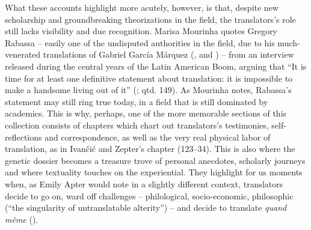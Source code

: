 \documentclass{article}
\begin{document}
What these accounts highlight more acutely, however, is that, despite
new scholarship and groundbreaking theorizations in the field, the
translators's role still lacks visibility and due recognition. Marisa
Mourinha quotes Gregory Rabassa -- easily one of the undisputed
authorities in the field, due to his much-venerated translations of
Gabriel García Márquez (\citeyear{marquez_one_1970}, \citeyear{marquez_autumn_1975} and \citeyear{marquez_chronicle_1983}) -- from an interview
released during the central years of the Latin American Boom, arguing
that ``It is time for at least one definitive statement about
translation: it is impossible to make a handsome living out of it''
(; qtd. 149). As Mourinha notes, Rabassa's statement may
still ring true today, in a field that is still dominated by academics.
This is why, perhaps, one of the more memorable sections of this
collection consists of chapters which chart out translators's
testimonies, self-reflections and correspondence, as well as the very
real physical labor of translation, as in Ivančić and Zepter's chapter
(123--34). This is also where the genetic dossier becomes a treasure
trove of personal anecdotes, scholarly journeys and where textuality
touches on the experiential. They highlight for us moments when, as
Emily Apter would note in a slightly different context, translators
decide to go on, ward off challenges -- philological, socio-economic,
philosophic (``the singularity of untranslatable alterity'') -- and
decide to translate \emph{quand même} ().


\begin{flushleft}
    \renewcommand*{\mkbibnamefamily}[1]{\textsc{#1}}
    \renewcommand*{\mkbibnamegiven}[1]{\textsc{#1}} 
\printbibliography
\end{flushleft}
\end{document}
